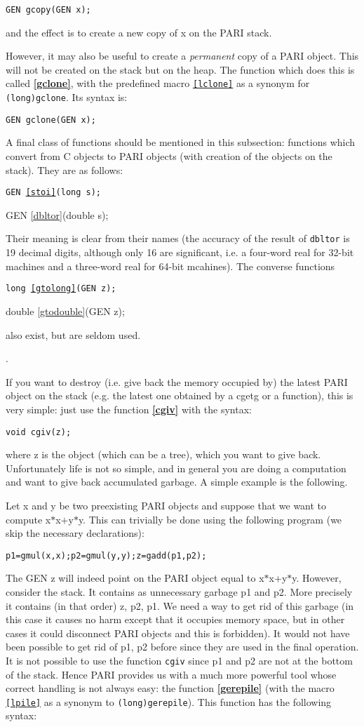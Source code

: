 {\tt GEN gcopy(GEN x);}

and the effect is to create a new copy of x on the PARI stack.

However, it may also be useful to create a {\sl permanent} copy of a PARI
object. This will not be created on the stack but on the heap. The function
which does this is called {\bf \ref{gclone}}, with the predefined macro 
{\tt \ref{lclone}} as a synonym for {\tt (long)gclone}. Its syntax is:

{\tt GEN gclone(GEN x);}

A final class of functions should be mentioned in this subsection: functions which
convert from C objects to PARI objects (with creation of the objects on the stack).
They are as follows:

{\tt GEN \ref{stoi}(long s);

GEN \ref{dbltor}(double s);}

Their meaning is clear from their names (the accuracy of the result of
{\tt dbltor} is 19 decimal digits, although only 16 are significant,
i.e. a four-word real for 32-bit machines and a three-word real for
64-bit mcahines). The converse functions

{\tt long \ref{gtolong}(GEN z);

double \ref{gtodouble}(GEN z);}

also exist, but are seldom used.

.

If you want to destroy (i.e. give back the memory occupied by) the latest PARI
object on the
stack (e.g. the latest one obtained by a cgetg or a function), this is very simple:
just use the function {\bf \ref{cgiv}} with the syntax:

{\tt void cgiv(z);}

where z is the object (which can be a tree), which you want to give back. Unfortunately
life is not so simple, and in general you are doing a computation and want to
give back accumulated garbage. A simple example is the following.

Let x and y be two preexisting PARI objects and suppose that we want to
compute x$*$x$+$y$*$y. This can trivially be done using the following program
(we skip the necessary declarations):

{\tt p1=gmul(x,x);p2=gmul(y,y);z=gadd(p1,p2);}

The GEN z will indeed point on the PARI object equal to x$*$x$+$y$*$y.
However, consider the stack. It contains as unnecessary garbage p1 and
p2. More precisely it contains (in that order) z, p2, p1. We need a way
to get rid of this garbage (in this case it causes no harm except that it
occupies memory space, but in other cases it could disconnect PARI
objects and this is forbidden).
It would not have been possible to get rid of p1, p2 before since they are
used in the final operation. It is not possible to use the function {\tt cgiv}
since p1 and p2 are not at the bottom of the stack. Hence PARI
provides us with a much more powerful tool whose correct handling is not
always easy: the function {\bf \ref{gerepile}} (with the macro 
{\tt \ref{lpile}} as a
synonym to {\tt (long)gerepile}). This function has the following syntax:

